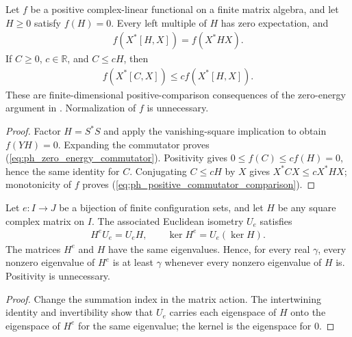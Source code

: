 \begin{lemma}
    \label{thm:positive_functional_commutator_comparison}
    \leanok
    Let $f$ be a positive complex-linear functional on a finite matrix
    algebra, and let $H\geq0$ satisfy $f(H)=0$. Every left multiple of
    $H$ has zero expectation, and
    \begin{align}
        f(X^*[H,X])=f(X^*HX).
        \label{eq:ph_zero_energy_commutator}
    \end{align}
    If $C\geq0$, $c\in\mathbb R$, and $C\leq cH$, then
    \begin{align}
        f(X^*[C,X])\leq c f(X^*[H,X]).
        \label{eq:ph_positive_commutator_comparison}
    \end{align}
    These are finite-dimensional positive-comparison consequences of the
    zero-energy argument in \cite[Section~6]{Nachtergaele1996Spectral}.
    Normalization of $f$ is unnecessary.
\end{lemma}
\begin{proof}\leanok
    Factor $H=S^*S$ and apply the vanishing-square implication to obtain
    $f(YH)=0$. Expanding the commutator proves
    (\ref{eq:ph_zero_energy_commutator}). Positivity gives
    $0\leq f(C)\leq c f(H)=0$, hence the same identity for $C$.
    Conjugating $C\leq cH$ by $X$ gives $X^*CX\leq cX^*HX$;
    monotonicity of $f$ proves (\ref{eq:ph_positive_commutator_comparison}).
\end{proof}

\begin{lemma}
    \label{thm:configuration_reindex_kernel_gap}
    \leanok
    Let $e:I\to J$ be a bijection of finite configuration sets, and let $H$
    be any square complex matrix on $I$. The associated Euclidean isometry
    $U_e$ satisfies
    \begin{align}
        H^e U_e=U_e H,\qquad \ker H^e=U_e(\ker H).
    \end{align}
    The matrices $H^e$ and $H$ have the same eigenvalues. Hence, for every
    real $\gamma$, every nonzero eigenvalue of $H^e$ is at least $\gamma$
    whenever every nonzero eigenvalue of $H$ is.
    Positivity is unnecessary.
\end{lemma}
\begin{proof}\leanok
    Change the summation index in the matrix action. The intertwining
    identity and invertibility show that $U_e$ carries each eigenspace of
    $H$ onto the eigenspace of $H^e$ for the same eigenvalue; the kernel
    is the eigenspace for $0$.
\end{proof}

